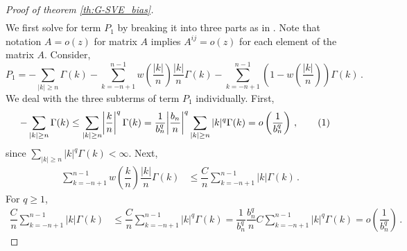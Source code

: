 \documentclass[11pt]{article}
\newcommand\numberthis{\addtocounter{equation}{1}\tag{\theequation}}
\theoremstyle{remark}
\begin{document}
\begin{proof}[Proof of theorem \ref{th:G-SVE_bias}]
\begin{align*}
\end{align*}
%
We first solve for term $P_1$ by breaking it into three parts as in \cite{hannan2009multiple}. Note that notation $A = o(z)$ for matrix $A$  implies $A^{ij} = o(z)$ for each element of the matrix $A$. Consider,
\begin{equation}
\label{eq:P1_decomp}
P_1 = -\sum_{|k|\geq n}\Gamma(k)  -  \sum_{k = -n+1}^{n-1}w\left(\dfrac{|k|}{n}\right)\dfrac{|k|}{n}\Gamma(k)- \sum_{k = -n+1}^{n-1}\left(1-w\left(\dfrac{|k|}{n}\right)\right)\Gamma(k)\,.  
\end{equation}
%
We deal with the three subterms of term $P_1$ individually. First,
%    
\begin{align*}
 {-\sum_{|k|\geq n}\Gamma(k)} &\leq  \sum_{|k|\geq n} \abs{\dfrac{k}{n}}^q   \Gamma(k) = \dfrac{1}{b_n^q}\abs{\dfrac{b_n}{n}}^q \sum_{|k|\geq n}|k|^q  \Gamma(k) = o\left(\dfrac{1}{b_n^q}\right)\,, \numberthis \label{eq:P1_first}
\end{align*}
%
since $\sum_{|k|\geq n}|k|^q \Gamma(k)  < \infty$. Next,
%
\begin{align*}
 \sum_{k = -n+1}^{n-1}w\left(\dfrac{k}{n}\right)\dfrac{|k|}{n}\Gamma(k)   &\leq \dfrac{C}{n}\sum_{k = -n+1}^{n-1}|k|  \Gamma(k)  \,.
\end{align*}
For $q\geq 1$,
\begin{align*}
\dfrac{C}{n}\sum_{k = -n+1}^{n-1}|k|  \Gamma(k) &\leq \dfrac{C}{n}\sum_{k = -n+1}^{n-1}|k|^q  \Gamma(k) = \dfrac{1}{b_n^q}\dfrac{b_n^q}{n} C\sum_{k = -n+1}^{n-1}|k|^q  \Gamma(k)  = o\left(\dfrac{1}{b_n^q}\right)\,.
\end{align*}
          

\end{proof}
\end{document}

